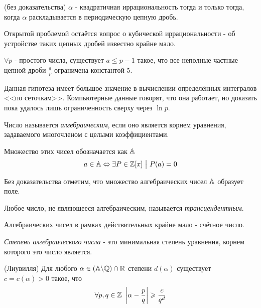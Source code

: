 \begin{theorem} (без доказательства)
	$\alpha$ - квадратичная иррациональность тогда и только тогда, когда $\alpha$ раскладывается в периодическую цепную дробь.
\end{theorem}

Открытой проблемой остаётся вопрос о кубической иррациональности - об устройстве таких цепных дробей известно крайне мало.

\begin{hypothesis}
	$\forall p$ - простого числа,  существует $a \le p - 1$ такое, что все неполные частные цепной дроби $\frac{a}{p}$ ограничена константой 5.
\end{hypothesis}

\begin{note}
	Данная гипотеза имеет большое значение в вычислении определённых интегралов <<по сеточкам>>. Компьютерные данные говорят, что она работает, но доказать пока удалось лишь ограниченность сверху через $\ln p$.
\end{note}

\begin{definition}
	Число называется \textit{алгебраическим}, если оно является корнем уравнения, задаваемого многочленом с целыми коэффициентами.
	
	Множество этих чисел обозначается как $\mathbb{A}$
	\[
		a \in \mathbb{A} \Leftrightarrow \exists P \in \mathbb{Z}[x] \ \big|\  P(a) = 0
	\]
\end{definition}

\begin{note}
	Без доказательства отметим, что множество алгебраических чисел $\mathbb{A}$ образует поле.
\end{note}

\begin{definition}
	Любое число, не являющееся алгебраическим, называется \textit{трансцендентным}.
\end{definition}

\begin{note}
	Алгебраических чисел в рамках действительных крайне мало - счётное число.
\end{note}

\begin{definition}
	\textit{Степень алгебраического числа} - это минимальная степень уравнения, корнем которого это число является.
\end{definition}

\begin{theorem} (Лиувилля)
	Для любого $\alpha \in (\mathbb{A} \backslash \mathbb{Q}) \cap \mathbb{R}$ степени $d(\alpha)$ существует $c = c(\alpha) > 0$ такое, что
	\[
		\forall p, q \in \Z\ \left|\alpha - \frac{p}{q}\right| \ge \frac{c}{q^d}
	\]
\end{theorem}

